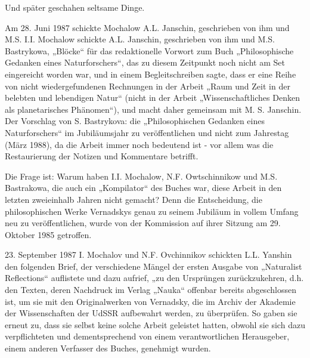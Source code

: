 \documentclass[11pt,a4paper]{article}
\begin{document}
Und später geschahen seltsame Dinge.

Am 28. Juni 1987 schickte Mochalow A.L. Janschin, geschrieben von ihm und
M.S. I.I. Mochalow schickte A.L. Janschin, geschrieben von ihm und
M.S. Bastrykowa, „Blöcke“ für das redaktionelle Vorwort zum Buch
„Philosophische Gedanken eines Naturforschers“, das zu diesem Zeitpunkt noch
nicht am Set eingereicht worden war, und in einem Begleitschreiben sagte, dass
er eine Reihe von nicht wiedergefundenen Rechnungen in der Arbeit „Raum und
Zeit in der belebten und lebendigen Natur“ (nicht in der Arbeit
„Wissenschaftliches Denken als planetarisches Phänomen“), und macht daher
gemeinsam mit M. S. Janschin. Der Vorschlag von S. Bastrykova: die
„Philosophischen Gedanken eines Naturforschers“ im Jubiläumsjahr zu
veröffentlichen und nicht zum Jahrestag (März 1988), da die Arbeit immer noch
bedeutend ist - vor allem was die Restaurierung der Notizen und Kommentare
betrifft.

Die Frage ist: Warum haben I.I. Mochalow, N.F. Owtschinnikow und
M.S. Bastrakowa, die auch ein „Kompilator“ des Buches war, diese Arbeit in den
letzten zweieinhalb Jahren nicht gemacht? Denn die Entscheidung, die
philosophischen Werke Vernadskys genau zu seinem Jubiläum in vollem Umfang neu
zu veröffentlichen, wurde von der Kommission auf ihrer Sitzung am 29. Oktober
1985 getroffen.

23. September 1987 I. Mochalov und N.F. Ovchinnikov schickten L.L. Yanshin den
folgenden Brief, der verschiedene Mängel der ersten Ausgabe von „Naturalist
Reflections“ auflistete und dazu aufrief, „zu den Ursprüngen zurückzukehren,
d.h. den Texten, deren Nachdruck im Verlag „Nauka“ offenbar bereits
abgeschlossen ist, um sie mit den Originalwerken von Vernadsky, die im Archiv
der Akademie der Wissenschaften der UdSSR aufbewahrt werden, zu überprüfen. So
gaben sie erneut zu, dass sie selbst keine solche Arbeit geleistet hatten,
obwohl sie sich dazu verpflichteten und dementsprechend von einem
verantwortlichen Herausgeber, einem anderen Verfasser des Buches, genehmigt
wurden.
\end{document}
